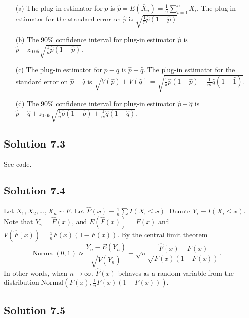 \begin{itemize}
    \item[(a)] The plug-in estimator for $p$ is $\hat{p} = E(\overline{X}_n) = \frac{1}{n} \sum_{i = 1}^n X_i$.
        The plug-in estimator for the standard error on $\hat{p}$ is $\sqrt{\frac{1}{n} \hat{p}(1 - \hat{p})}$.
    \item[(b)] The 90\% confidence interval for plug-in estimator $\hat{p}$ is $\hat{p} \pm z_{0.05} \sqrt{\frac{1}{n} \hat{p}(1 - \hat{p})}$.
    \item[(c)] The plug-in estimator for $p - q$ is $\hat{p} - \hat{q}$.
        The plug-in estimator for the standard error on $\hat{p} - \hat{q}$ is $\sqrt{V(\hat{p}) + V(\hat{q})} = \sqrt{\frac{1}{n} \hat{p}(1 - \hat{p}) + \frac{1}{m} \hat{q}(1 - \hat{1})}$.
    \item[(d)] The 90\% confidence interval for plug-in estimator $\hat{p} - \hat{q}$ is $\hat{p} - \hat{q} \pm z_{0.05} \sqrt{\frac{1}{n} \hat{p}(1 - \hat{p}) + \frac{1}{m} \hat{q}(1 - \hat{q})}$.
\end{itemize}


\subsection*{Solution 7.3}

See code.


\subsection*{Solution 7.4}

Let $X_1, X_2, ..., X_n \sim F$.
Let $\hat{F}(x) = \frac{1}{n} \sum I(X_i \leq x)$.
Denote $Y_i = I(X_i \leq x)$.
Note that $\overline{Y}_n = \hat{F}(x)$, and $E(\hat{F}(x)) = F(x)$ and $V(\hat{F}(x)) = \frac{1}{n} F(x)(1 - F(x))$.
By the central limit theorem
\begin{equation*}
    \mathrm{Normal}(0, 1) \approx \frac{\overline{Y}_n - E(\overline{Y}_n)}{\sqrt{V(\overline{Y}_n)}}
        = \sqrt{n} \frac{\hat{F}(x) - F(x)}{\sqrt{F(x)(1 - F(x))}}.
\end{equation*}
In other words, when $n \to \infty$, $\hat{F}(x)$ behaves as a random variable from the distribution $\mathrm{Normal}(F(x), \frac{1}{n} F(x)(1 - F(x)))$.


\subsection*{Solution 7.5}

